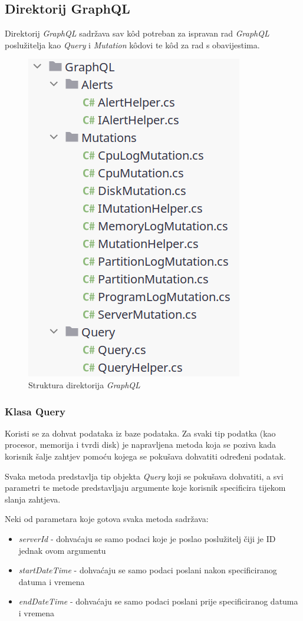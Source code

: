 \documentclass[zavrsnirad]{fer}
\begin{document}
\subsection{Direktorij GraphQL}
\label{pog:graphql_dir}
Direktorij \textit{GraphQL} sadržava sav kôd potreban za ispravan rad \textit{GraphQL} poslužitelja kao \textit{Query} i \textit{Mutation} kôdovi te kôd za rad s obavijestima.

\begin{figure}[htb!]
	\centering
	\includegraphics[width=0.4\linewidth]{images/graphql_dir_structure.png} 
	\caption{Struktura direktorija \textit{GraphQL}}
\label{slk:graphql_dir_structure}
\end{figure}
\FloatBarrier

\subsubsection{Klasa Query}
\label{pog:query.cs}
Koristi se za dohvat podataka iz baze podataka. Za svaki tip podatka (kao procesor, memorija i tvrdi disk) je napravljena metoda koja se poziva kada korisnik šalje zahtjev pomoću kojega se pokušava dohvatiti određeni podatak.

Svaka metoda predstavlja tip objekta \textit{Query} koji se pokušava dohvatiti, a svi parametri te metode predstavljaju argumente koje korisnik specificira tijekom slanja zahtjeva.

Neki od parametara koje gotova svaka metoda sadržava:
\begin{itemize}
	\item \textit{serverId} - dohvaćaju se samo podaci koje je poslao poslužitelj čiji je ID jednak ovom argumentu
	\item \textit{startDateTime} - dohvaćaju se samo podaci poslani nakon specificiranog datuma i vremena
	\item \textit{endDateTime} - dohvaćaju se samo podaci poslani prije specificiranog datuma i vremena
\end{itemize}
\end{document}
